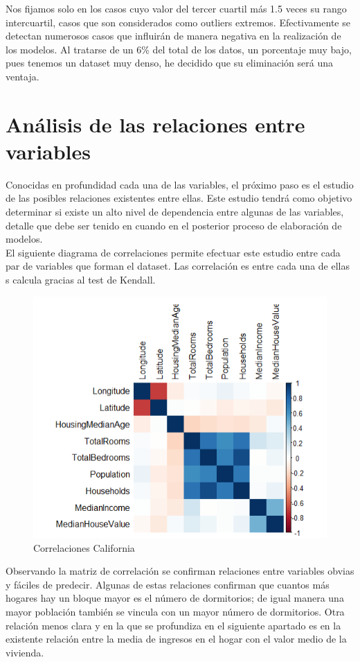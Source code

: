 Nos fijamos solo en los casos cuyo valor del tercer cuartil más 1.5 veces su rango intercuartil, casos que son considerados como outliers extremos. Efectivamente se detectan numerosos casos que influirán de manera negativa en la realización de los modelos. Al tratarse de un 6\% del total de los datos, un porcentaje muy bajo, pues tenemos un dataset muy denso, he decidido que su eliminación será una ventaja.




\newpage
\section{Análisis de las relaciones entre variables}
Conocidas en profundidad cada una de las variables, el próximo paso es el estudio de las posibles relaciones existentes entre ellas. Este estudio tendrá como objetivo determinar si existe un alto nivel de dependencia entre algunas de las variables, detalle que debe ser tenido en cuando en el posterior proceso de elaboración de modelos.\\

El siguiente diagrama de correlaciones permite efectuar este estudio entre cada par de variables que forman el dataset. Las correlación es entre cada una de ellas s calcula gracias al test de Kendall.

\begin{figure}[h!]
	\centering
	\includegraphics[width=0.7\linewidth]{figures/corre_1}
	\caption{Correlaciones California}
	\label{fig:corre1}
\end{figure}


Observando la matriz de correlación se confirman relaciones entre variables obvias y fáciles de predecir. Algunas de estas relaciones confirman que cuantos más hogares hay un bloque mayor es el número de dormitorios; de igual manera una mayor población también se vincula con un mayor número de dormitorios. Otra relación menos clara y en la que se profundiza en el siguiente apartado es en la existente relación entre la media de ingresos en el hogar con el valor medio de la vivienda.



